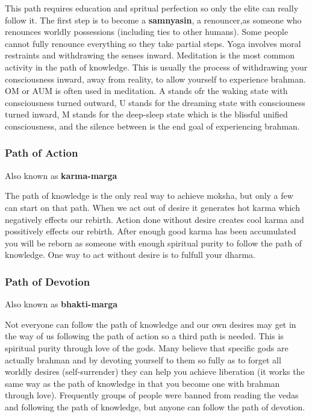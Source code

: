 \documentclass{article}
\begin{document}
This path requires education and spritual perfection so only the elite can really follow it. The first step is to become a \textbf{samnyasin}, a renouncer,as someone who renounces worldly possessions (including ties to other humans). Some people cannot fully renounce everything so they take partial steps. Yoga involves moral restraints and withdrawing the senses inward. Meditation is the most common activity in the path of knowledge. This is usually the process of withdrawing your consciousness inward, away from reality, to allow yourself to experience brahman. OM or AUM is often used in meditation. A stands ofr the waking state with consciousness turned outward, U stands for the dreaming state with consciouness turned inward, M stands for the deep-sleep state which is the blissful unified consciousness, and the silence between  is the end goal of experiencing brahman.

\subsubsection{Path of Action}
\label{ssub:path_of_action}
Also known as \textbf{karma-marga}

The path of knowledge is the only real way to achieve moksha, but only a few can start on that path. When we act out of desire it generates hot karma which negatively effects our rebirth. Action done without desire creates cool karma and possitively effects our rebirth. After enough good karma has been accumulated you will be reborn as someone with enough spiritual purity to follow the path of knowledge. One way to act without desire is to fulfull your dharma.

\subsubsection{Path of Devotion}
\label{ssub:path_of_devotion}
Also known as \textbf{bhakti-marga}

Not everyone can follow the path of knowledge and our own desires may get in the way of us following the path of action so a third path is needed. This is spiritual purity through love of the gods. Many believe that specific gods are actually brahman and by devoting yourself to them so fully as to forget all worldly desires (self-surrender) they can help you achieve liberation (it works the same way as the path of knowledge in that you become one with brahman through love). Frequently groups of people were banned from reading the vedas and following the path of knowledge, but anyone can follow the path of devotion.
\end{document}
